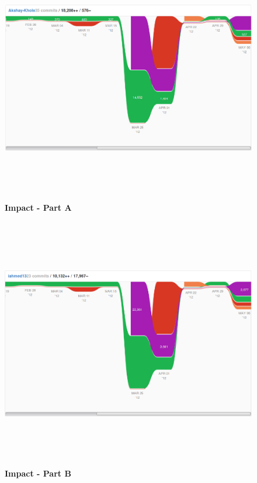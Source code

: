 \begin{figure}[H]
  \centering
    \includegraphics[height= 11cm, width=17cm]{project/images/GitHub/impact-aki}
  \caption{\textbf{Impact - Part A}}
\end{figure}
\vspace{1cm}
\begin{figure}[H]
  \centering
    \includegraphics[height= 11cm, width=17cm]{project/images/GitHub/impact-imran}
  \caption{\textbf{Impact - Part B}}
\end{figure}
\newpage
